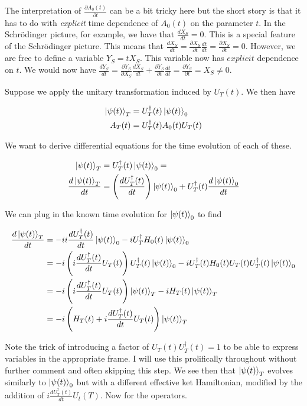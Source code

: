 \documentclass[12pt]{article}
\newcommand{\ddt}[1]{\frac{d #1}{dt}}
\begin{document}
The interpretation of $\frac{\partial A_0(t)}{\partial t}$ can be a bit tricky here but the short story is that it has to do with \textit{explicit} time dependence of $A_0(t)$ on the parameter $t$. In the Schr{\"o}dinger picture, for example, we have that $\ddt{X_S} = 0$. This is a special feature of the Schr{\"o}dinger picture. This means that $\ddt{X_S} = \frac{\partial X_S}{\partial t} \ddt{t} = \frac{\partial X_S}{\partial t} =  0$. However, we are free to define a variable $Y_S = t X_S$. This variable now has $\textit{explicit}$ dependence on $t$. We would now have $\ddt{Y_S} = \frac{\partial{Y_S}}{\partial X_S} \ddt{X_S} + \frac{\partial{Y_S}}{\partial t} \ddt{t} = \frac{\partial Y_S}{\partial t} = X_S \neq 0$.

Suppose we apply the unitary transformation induced by $U_T(t)$. We then have

\begin{align}
\ket{\psi(t)}_T &= U_T^{\dag}(t) \ket{\psi(t)}_0\\
A_T(t) &= U_T^{\dag}(t) A_0(t) U_T(t)
\end{align}

We want to derive differential equations for the time evolution of each of these.

\begin{align}
\ket{\psi(t)}_T &= U_T^{\dag}(t)\ket{\psi(t)}_0 =\\
\ddt{\ket{\psi(t)}_T} &= \left(\ddt{U_T^{\dag}(t)} \right) \ket{\psi(t)}_0 + U_T^{\dag}(t) \ddt{\ket{\psi(t)}_0}
\end{align}

We can plug in the known time evolution for $\ket{\psi(t)}_0$ to find

\begin{align}
\ddt{\ket{\psi(t)}_T} &= -i i\ddt{U_T^{\dag}(t)} \ket{\psi(t)}_0 -i U_T^{\dag} H_0(t) \ket{\psi(t)}_0\\
&= -i \left(i\ddt{U_T^{\dag}(t)} U_T(t)\right) U_T^{\dag}(t) \ket{\psi(t)}_0 -i U_T^{\dag}(t) H_0(t)U_T(t)U_T^{\dag}(t) \ket{\psi(t)}_0\\
&= -i \left(i\ddt{U_T^{\dag}(t)} U_T(t)\right) \ket{\psi(t)}_T - i H_T(t) \ket{\psi(t)}_T\\
&= -i \left(H_T(t) + i \ddt{U_T^{\dag}(t)} U_T(t)\right)\ket{\psi(t)}_T
\end{align}

Note the trick of introducing a factor of $U_T(t)U_T^{\dag}(t) = 1$ to be able to express variables in the appropriate frame. I will use this prolifically throughout without further comment and often skipping this step.
We see then that $\ket{\psi(t)}_T$ evolves similarly to $\ket{\psi(t)}_0$ but with a different effective ket Hamiltonian, modified by the addition of $i \ddt{U_T^{\dag}(t)} U_t(T)$. Now for the operators.
\end{document}
